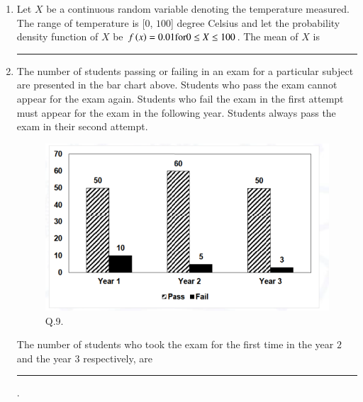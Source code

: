\documentclass[journal,12pt,onecolumn]{IEEEtran}
\theoremstyle{remark}
\begin{document}
\begin{enumerate}
    \item Let $X$ be a continuous random variable denoting the temperature measured. The range of temperature is [$0$, $100$] degree Celsius and let the probability density function of $X$ be $f\left(x\right)=0.01 \text{for} 0 \leq X \leq 100$. The mean of $X$ is \rule{3cm}{0.15mm} \hfill{}
        \begin{enumerate}
        \end{enumerate}
    
    \item The number of students passing or failing in an exam for a particular subject are presented in the bar chart above. Students who pass the exam cannot appear for the exam again. Students who fail the exam in the first attempt must appear for the exam in the following year. Students always pass the exam in their second attempt.
        \begin{figure}[h]
            \centering
            \includegraphics[width=0.6\columnwidth]{Figs/fig_3.png}
            \caption{Q.9.}
            \label{fig:q9}
        \end{figure}
    The number of students who took the exam for the first time in the year $2$ and the year $3$ respectively, are \rule{3cm}{0.15mm}. \hfill{}
        \begin{enumerate}
        \end{enumerate}
    

\end{enumerate}
\end{document}
